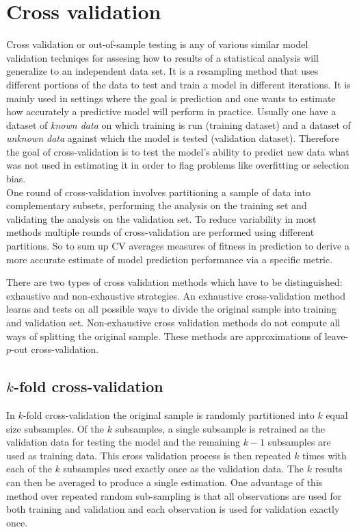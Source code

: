 \documentclass[12pt, a4paper]{article}
\begin{document}
\newpage
\section{Cross validation}

Cross validation or out-of-sample testing is any of various similar model validation techniqes for assesing how to results of a statistical analysis will generalize to an independent data set. It is a resampling method that uses different portions of the data to test and train a model in different iterations. It is mainly used in settings where the goal is prediction and one wants to estimate how accurately a predictive model will perform in practice. Usually one have a dataset of \textit{known data} on which training is run (training dataset) and a dataset of \textit{unknown data} against which the model is tested (validation dataset).
Therefore the goal of cross-validation is to test the model's ability to predict new data what was not used in estimating it in order to flag problems like overfitting or selection bias. \\
One round of cross-validation involves partitioning a sample of data into complementary subsets, performing the analysis on the training set and validating the analysis on the validation set.
To reduce variability in most methods multiple rounds of cross-validation are performed using different partitions. So to sum up CV averages measures of fitness in prediction to derive a more accurate estimate of model prediction performance via a specific metric.

There are two types of cross validation methods which have to be distinguished: exhaustive and non-exhaustive strategies. An exhaustive cross-validation method learns and tests on all possible ways to divide the original sample into training and validation set. Non-exhaustive cross validation methods do not compute all ways of splitting the original sample. These methods are approximations of leave-$p$-out cross-validation.

\subsection{$k$-fold cross-validation}
In $k$-fold cross-validation the original sample is randomly partitioned into $k$ equal size subsamples.
Of the $k$ subsamples, a single subsample is retrained as the validation data for testing the model and the remaining $k - 1$ subsamples are used as training data. This cross validation process is then repeated $k$ times with each of the $k$ subsamples used exactly once as the validation data. The $k$ results can then be averaged to produce a single estimation. One advantage of this method over repeated random sub-sampling is that all observations are used for both training and validation and each observation is used for validation exactly once.
\end{document}
